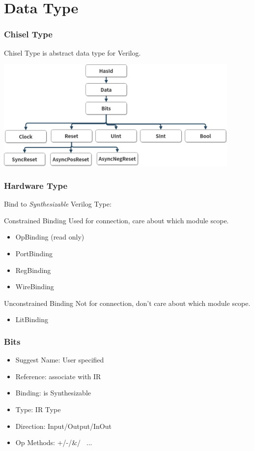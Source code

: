\section{Data Type}

\begin{frame}
  \frametitle{Chisel Type}

  Chisel Type is abstract data type for Verilog.

  \includegraphics[width = 12cm]{./fig/datatype.png}
\end{frame}

\begin{frame}
  \frametitle{Hardware Type}

  Bind  to \emph{Synthesizable} Verilog Type:

  \begin{block}{Constrained Binding}
    Used for connection, care about which module scope.
    \begin{itemize}
      \item OpBinding (read only)
      \item PortBinding
      \item RegBinding
      \item WireBinding
    \end{itemize}
  \end{block}

  \begin{block}{Unconstrained Binding}
    Not for connection, don't care about which module scope.
    \begin{itemize}
    \item LitBinding
    \end{itemize}
  \end{block}

\end{frame}

\begin{frame}
  \frametitle{Bits}

  \begin{itemize}
    \item Suggest Name: User specified
    \item Reference: associate with IR
    \item Binding: is Synthesizable
    \item Type: IR Type
    \item Direction: Input/Output/InOut
    \item Op Methods: +/-/\&/~ ...
  \end{itemize}

\end{frame}

